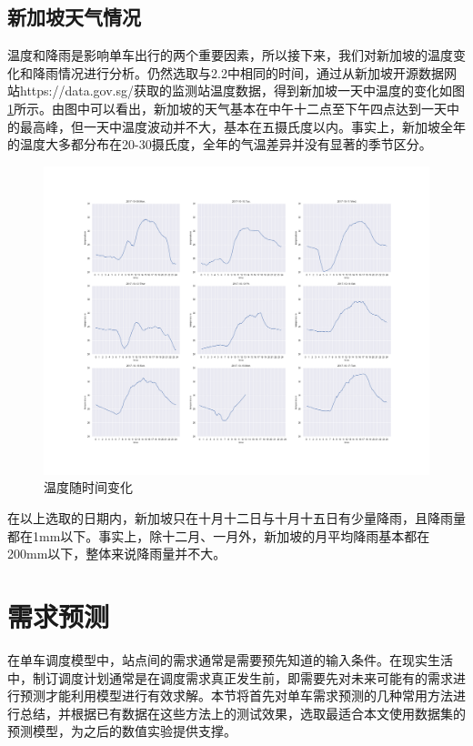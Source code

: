 \documentclass[]{tongjithesis}
\numberwithin{equation}{chapter}
\begin{document}
\section{新加坡天气情况}

温度和降雨是影响单车出行的两个重要因素，所以接下来，我们对新加坡的温度变化和降雨情况进行分析。仍然选取与2.2中相同的时间，通过从新加坡开源数据网站https://data.gov.sg/获取的监测站温度数据，得到新加坡一天中温度的变化如图\ref{tempre}所示。由图中可以看出，新加坡的天气基本在中午十二点至下午四点达到一天中的最高峰，但一天中温度波动并不大，基本在五摄氏度以内。事实上，新加坡全年的温度大多都分布在20-30摄氏度，全年的气温差异并没有显著的季节区分。
\begin{figure}[H]
	\centering
	\includegraphics[width= 1.0 \textwidth]{figures_main/tempre.png}
	\caption{温度随时间变化}
	\label{tempre}
\end{figure}

在以上选取的日期内，新加坡只在十月十二日与十月十五日有少量降雨，且降雨量都在1mm以下。事实上，除十二月、一月外，新加坡的月平均降雨基本都在200mm以下，整体来说降雨量并不大。
\clearpage

\chapter{需求预测}
在单车调度模型中，站点间的需求通常是需要预先知道的输入条件。在现实生活中，制订调度计划通常是在调度需求真正发生前，即需要先对未来可能有的需求进行预测才能利用模型进行有效求解。本节将首先对单车需求预测的几种常用方法进行总结，并根据已有数据在这些方法上的测试效果，选取最适合本文使用数据集的预测模型，为之后的数值实验提供支撑。
\end{document}
